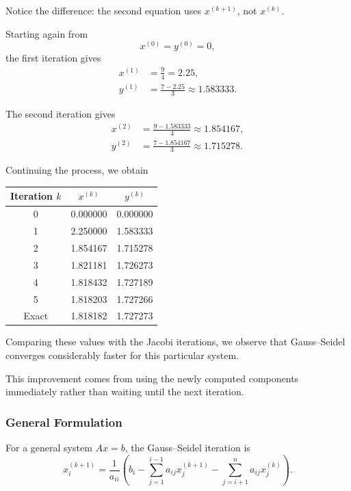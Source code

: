 \documentclass[11pt,a4paper]{article}
\theoremstyle{definition}
\theoremstyle{remark}
\begin{document}
Notice the difference: the second equation uses
$x^{(k+1)}$, not $x^{(k)}$.

Starting again from
\[
    x^{(0)}=y^{(0)}=0,
\]
the first iteration gives
\[
\begin{aligned}
    x^{(1)}&=\frac94=2.25,\\
    y^{(1)}&=\frac{7-2.25}{3}
             \approx1.583333.
\end{aligned}
\]

The second iteration gives
\[
\begin{aligned}
    x^{(2)}
    &=\frac{9-1.583333}{4}
      \approx1.854167,\\
    y^{(2)}
    &=\frac{7-1.854167}{3}
      \approx1.715278.
\end{aligned}
\]

Continuing the process, we obtain

\begin{center}
\begin{tabular}{ccc}
\toprule
Iteration $k$ & $x^{(k)}$ & $y^{(k)}$\\
\midrule
0 & 0.000000 & 0.000000\\
1 & 2.250000 & 1.583333\\
2 & 1.854167 & 1.715278\\
3 & 1.821181 & 1.726273\\
4 & 1.818432 & 1.727189\\
5 & 1.818203 & 1.727266\\
\midrule
Exact & 1.818182 & 1.727273\\
\bottomrule
\end{tabular}
\end{center}

Comparing these values with the Jacobi iterations,
we observe that Gauss--Seidel converges considerably
faster for this particular system.

This improvement comes from using the newly
computed components immediately rather than
waiting until the next iteration.

\subsubsection*{General Formulation}

For a general system $Ax=b$, the Gauss--Seidel
iteration is
\begin{equation}
    \boxed{
    x_i^{(k+1)}
    =
    \frac{1}{a_{ii}}
    \left(
        b_i
        -
        \sum_{j=1}^{i-1}
        a_{ij}x_j^{(k+1)}
        -
        \sum_{j=i+1}^{n}
        a_{ij}x_j^{(k)}
    \right).
    }
    \label{eq:gs_component}
\end{equation}
\end{document}
